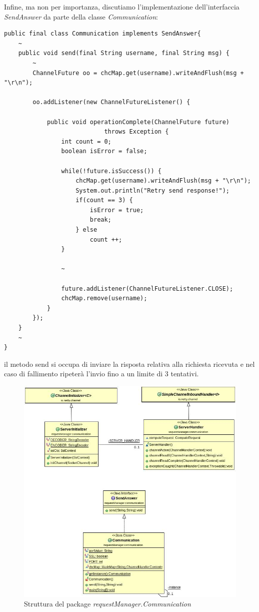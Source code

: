 Infine, ma non per importanza, discutiamo l'implementazione dell'interfaccia \textit{SendAnswer} da parte della classe \textit{Communication}:
\begin{lstlisting}
public final class Communication implements SendAnswer{
	~
	public void send(final String username, final String msg) {
		~
		ChannelFuture oo = chcMap.get(username).writeAndFlush(msg + "\r\n");
		
		oo.addListener(new ChannelFutureListener() {
		
			public void operationComplete(ChannelFuture future)	
							throws Exception {
				int count = 0;
				boolean isError = false;
				
				while(!future.isSuccess()) {
					chcMap.get(username).writeAndFlush(msg + "\r\n");
					System.out.println("Retry send response!");
					if(count == 3) {
						isError = true;
						break;
					} else 
						count ++;
				}
				
				~
				
				future.addListener(ChannelFutureListener.CLOSE);
				chcMap.remove(username);
			}
		});
	}
	~
}
\end{lstlisting}
il metodo send si occupa di inviare la risposta relativa alla richiesta ricevuta e nel caso di fallimento ripeterà l'invio fino a un limite di 3 tentativi.
\begin{figure}[h]
	\includegraphics[width=\textwidth]{Immagini/CommunicationPackageServer}
	\caption{Struttura del package \textit{requestManager.Communication}}
	\label{fig:xx}
\end{figure}
